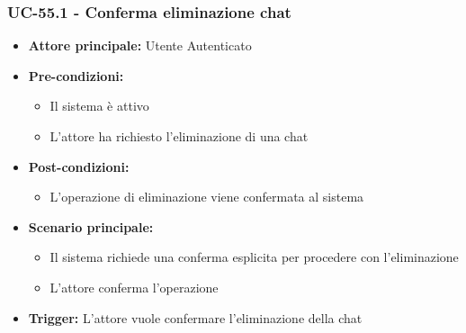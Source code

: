 \documentclass[a4paper,12pt]{article}
\begin{document}
\subsubsection{UC-55.1 - Conferma eliminazione chat} \label{subsec:UC-55.1}
\begin{itemize}
    \item \textbf{Attore principale:} Utente Autenticato
    \item \textbf{Pre-condizioni:}
    \begin{itemize}
        \item Il sistema è attivo
        \item L'attore ha richiesto l'eliminazione di una chat
    \end{itemize}
    \item \textbf{Post-condizioni:} 
    \begin{itemize}
        \item L'operazione di eliminazione viene confermata al sistema
    \end{itemize}
    \item \textbf{Scenario principale:} 
    \begin{itemize}
        \item Il sistema richiede una conferma esplicita per procedere con l'eliminazione
        \item L'attore conferma l'operazione
    \end{itemize}
    \item \textbf{Trigger:} L'attore vuole confermare l'eliminazione della chat
\end{itemize}
\end{document}
